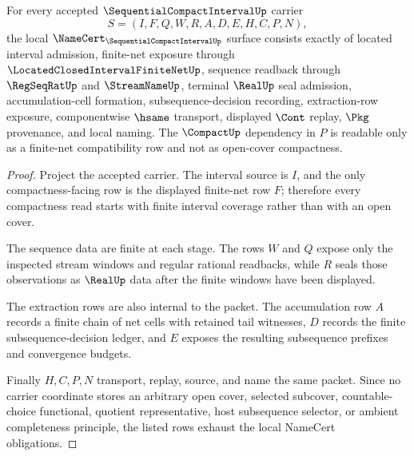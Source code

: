 \begin{theorem}
\label{thm:sequential-compact-interval-namecert-obligations}
For every accepted $\SequentialCompactIntervalUp$ carrier
$$
S=(I,F,Q,W,R,A,D,E,H,C,P,N),
$$
the local $\NameCert_{\SequentialCompactIntervalUp}$ surface consists exactly of located interval admission, finite-net exposure through $\LocatedClosedIntervalFiniteNetUp$, sequence readback through $\RegSeqRatUp$ and $\StreamNameUp$, terminal $\RealUp$ seal admission, accumulation-cell formation, subsequence-decision recording, extraction-row exposure, componentwise $\hsame$ transport, displayed $\Cont$ replay, $\Pkg$ provenance, and local naming. The $\CompactUp$ dependency in $P$ is readable only as a finite-net compatibility row and not as open-cover compactness.
\end{theorem}
\begin{proof}
Project the accepted carrier. The interval source is $I$, and the only compactness-facing row is the displayed finite-net row $F$; therefore every compactness read starts with finite interval coverage rather than with an open cover.

The sequence data are finite at each stage. The rows $W$ and $Q$ expose only the inspected stream windows and regular rational readbacks, while $R$ seals those observations as $\RealUp$ data after the finite windows have been displayed.

The extraction rows are also internal to the packet. The accumulation row $A$ records a finite chain of net cells with retained tail witnesses, $D$ records the finite subsequence-decision ledger, and $E$ exposes the resulting subsequence prefixes and convergence budgets.

Finally $H,C,P,N$ transport, replay, source, and name the same packet. Since no carrier coordinate stores an arbitrary open cover, selected subcover, countable-choice functional, quotient representative, host subsequence selector, or ambient completeness principle, the listed rows exhaust the local NameCert obligations.
\end{proof}

